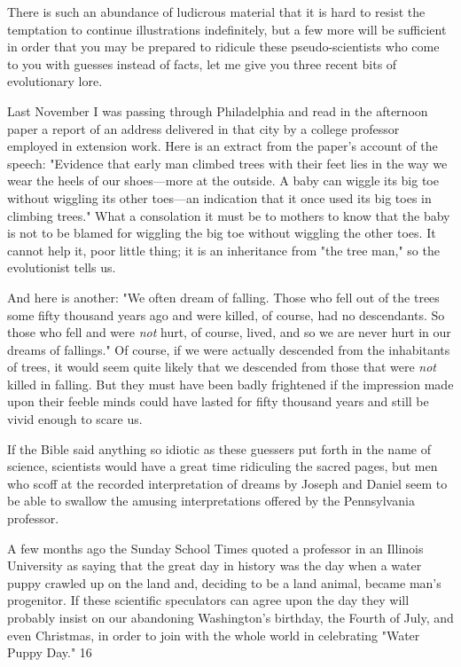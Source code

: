 There is such an abundance of ludicrous material that it is hard to resist the temptation to
continue illustrations indefinitely, but a few more will be sufficient in order that you may be
prepared to ridicule these pseudo-scientists who come to you with guesses instead of facts,
let me give you three recent bits of evolutionary lore.

Last November I was passing through Philadelphia and read in the afternoon paper a report
of an address delivered in that city by a college professor employed in extension work. Here
is an extract from the paper's account of the speech: "Evidence that early man climbed trees
with their feet lies in the way we wear the heels of our shoes—more at the outside. A baby
can wiggle its big toe without wiggling its other toes—an indication that it once used its big
toes in climbing trees." What a consolation it must be to mothers to know that the baby is not
to be blamed for wiggling the big toe without wiggling the other toes. It cannot help it, poor
little thing; it is an inheritance from "the tree man," so the evolutionist tells us.

And here is another: "We often dream of falling. Those who fell out of the trees some fifty
thousand years ago and were killed, of course, had no descendants. So those who fell and
were \textit{not} hurt, of course, lived, and so we are never hurt in our dreams of fallings." Of course,
if we were actually descended from the inhabitants of trees, it would seem quite likely that
we descended from those that were \textit{not} killed in falling. But they must have been badly
frightened if the impression made upon their feeble minds could have lasted for fifty
thousand years and still be vivid enough to scare us.

If the Bible said anything so idiotic as these guessers put forth in the name of science,
scientists would have a great time ridiculing the sacred pages, but men who scoff at the
recorded interpretation of dreams by Joseph and Daniel seem to be able to swallow the
amusing interpretations offered by the Pennsylvania professor.

A few months ago the Sunday School Times quoted a professor in an Illinois University as
saying that the great day in history was the day when a water puppy crawled up on the land
and, deciding to be a land animal, became man's progenitor. If these scientific speculators
can agree upon the day they will probably insist on our abandoning Washington's birthday,
the Fourth of July, and even Christmas, in order to join with the whole world in celebrating
"Water Puppy Day." 16

